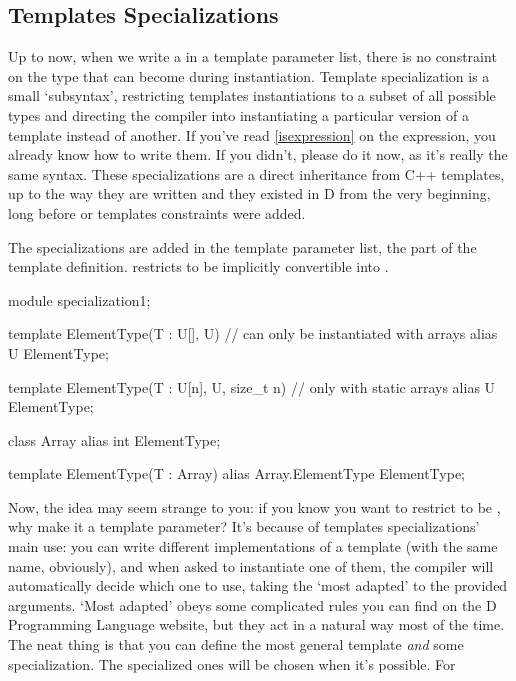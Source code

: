 \subsection{Templates Specializations}\label{specializations}

Up to now, when we write a  in a template parameter list, there is no constraint on the type that  can become during instantiation. Template specialization is a small `subsyntax', restricting templates instantiations to a subset of all possible types and directing the compiler into instantiating a particular version of a template instead of another. If you've read \autoref{isexpression} on the  expression, you already know how to write them. If you didn't, please do it now, as it's really the same syntax. These specializations are a direct inheritance from C++ templates, up to the way they are written and they existed in D from the very beginning, long before  or templates constraints were added. 

The specializations are added in the template parameter list, the  part of the template definition.  restricts  to be implicitly convertible into . 

\begin{dcode}
module specialization1;

template ElementType(T : U[], U) // can only be instantiated with arrays
{
    alias U ElementType;
}

template ElementType(T : U[n], U, size_t n) // only with static arrays
{
    alias U ElementType;
}

class Array { alias int ElementType;}

template ElementType(T : Array) 
{
    alias Array.ElementType ElementType;
}
\end{dcode}

Now, the idea may seem strange to you: if you know you want to restrict  to be , why make it a template parameter? It's because of templates specializations' main use: you can write different implementations of a template (with the same name, obviously), and when asked to instantiate one of them, the compiler will automatically decide which one to use, taking the `most adapted' to the provided arguments. `Most adapted' obeys some complicated rules you can find on the D Programming Language website, but they act in a natural way most of the time. The neat thing is that you can define the most general template \emph{and} some specialization. The specialized ones will be chosen when it's possible. For 

